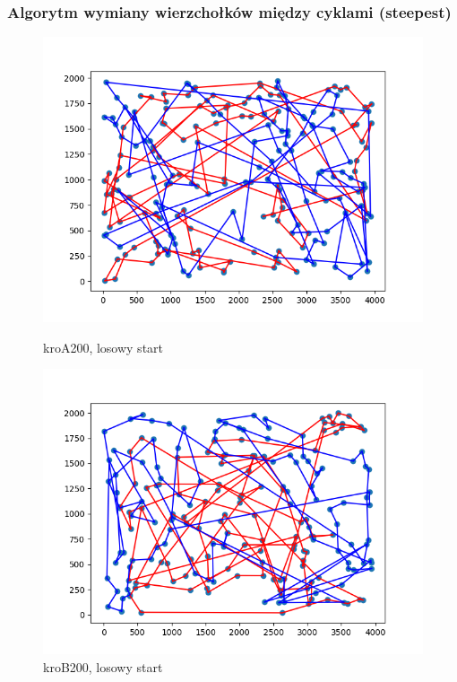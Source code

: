 \documentclass[11pt]{article}
\begin{document}
\subsubsection{Algorytm wymiany wierzchołków między cyklami (steepest)}
\begin{figure}[H]
    \centering
    \begin{minipage}[t]{0.45\textwidth}
        \centering
        \includegraphics[width=\linewidth]{best_paths/kroA200/traverse_steepest_shuffle/randomstart.png}
        \caption{kroA200, losowy start}
    \end{minipage}
    \hfill
    \begin{minipage}[t]{0.45\textwidth}
        \centering
        \includegraphics[width=\linewidth]{best_paths/kroB200/traverse_steepest_shuffle/randomstart.png}
        \caption{kroB200, losowy start}
    \end{minipage}


\end{figure}
\end{document}
